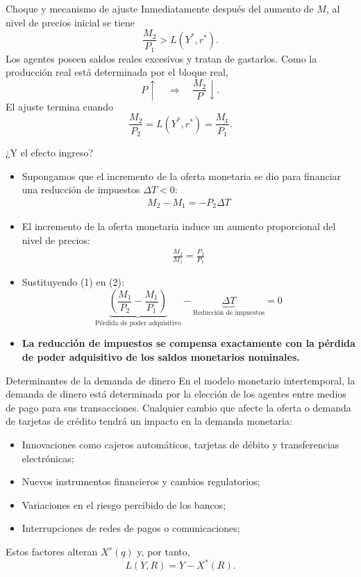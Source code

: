 \documentclass[aspectratio=169,11pt]{beamer}
\newcommand{\cidehighlight}[1]{\textcolor{CIDEBlue}{\bfseries #1}}
\begin{document}
\begin{frame}{Choque y mecanismo de ajuste}
  \small
  Inmediatamente después del aumento de $M$, al nivel de precios inicial se tiene
  \[
    \frac{M_2}{P_1}>L(Y^*,r^*).
  \]
  Los agentes poseen saldos reales excesivos y tratan de gastarlos. Como la producción real está determinada por el bloque real,
  \[
    P\uparrow\quad\Longrightarrow\quad \frac{M_2}{P}\downarrow.
  \]
  El ajuste termina cuando
  \[
    \frac{M_2}{P_2}=L(Y^*,r^*)=\frac{M_1}{P_1}.
  \]
\end{frame}



\begin{frame}{¿Y el efecto ingreso?}
  \small
  \begin{itemize}
    \setlength{\itemsep}{0.5em}

    \item Supongamos que el incremento de la oferta monetaria se dio para financiar una reducción de impuestos $\Delta T<0$:
    \begin{align*}
        M_2-M_1=-P_2\Delta T \tag{1}
    \end{align*}

    \item El incremento de la oferta monetaria induce un aumento proporcional del nivel de precios:
    \begin{align*}
      \frac{M_2}{M_1}=\frac{P_2}{P_1} \tag{2}
    \end{align*}

    \item Sustituyendo (1) en (2):
    \[
      \underbrace{\left(
      \frac{M_1}{P_2}-\frac{M_1}{P_1}
      \right)}_{\text{Pérdida de poder adquisitivo}}
      -\underbrace{\Delta T}_{\text{Reducción de impuestos}}
      =0
    \]

    \item \cidehighlight{La reducción de impuestos se compensa exactamente con la pérdida de poder adquisitivo de los saldos monetarios nominales.}
  \end{itemize}
\end{frame}




\begin{frame}{Determinantes de la demanda de dinero}
En el modelo monetario intertemporal, la demanda de dinero está determinada por la elección de los agentes entre medios de pago para sus transacciones. Cualquier cambio que afecte la oferta o demanda de tarjetas de crédito tendrá un impacto en la demanda monetaria:
  \begin{itemize}
    \setlength{\itemsep}{0.45em}
    \item Innovaciones como cajeros automáticos, tarjetas de débito y transferencias electrónicas;
    \item Nuevos instrumentos financieros y cambios regulatorios;
    \item Variaciones en el riesgo percibido de los bancos;
    \item Interrupciones de redes de pagos o comunicaciones;
  \end{itemize}
  Estos factores alteran $X^s(q)$ y, por tanto,
  \[
    L(Y,R)=Y-X^*(R).
  \]
\end{frame}
\end{document}
